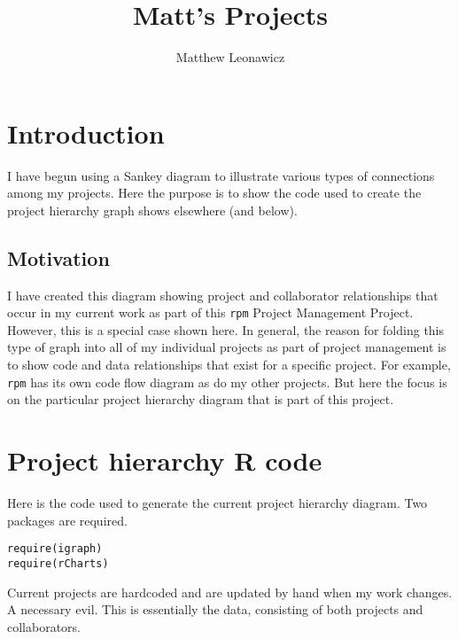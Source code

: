 \documentclass{article}\usepackage[]{graphicx}\usepackage[]{color}
\makeatletter
\newcommand{\hlstd}[1]{\textcolor[rgb]{0.514,0.58,0.588}{#1}}%
\newcommand{\hlkwd}[1]{\textcolor[rgb]{0.576,0.631,0.631}{#1}}%
\newenvironment{kframe}{%
 \def\at@end@of@kframe{}%
 \ifinner\ifhmode%
  \def\at@end@of@kframe{\end{minipage}}%
  \begin{minipage}{\columnwidth}%
 \fi\fi%
 \def\FrameCommand##1{\hskip\@totalleftmargin \hskip-\fboxsep
 \colorbox{shadecolor}{##1}\hskip-\fboxsep
     \hskip-\linewidth \hskip-\@totalleftmargin \hskip\columnwidth}%
 \MakeFramed {\advance\hsize-\width
   \@totalleftmargin\z@ \linewidth\hsize
   \@setminipage}}%
 {\par\unskip\endMakeFramed%
 \at@end@of@kframe}
\newenvironment{knitrout}{}{} %
\makeatother
\begin{document}
\title{Matt's Projects}
\author{Matthew Leonawicz}
\maketitle






\section{Introduction}
I have begun using a Sankey diagram to illustrate various types of connections among my projects.
Here the purpose is to show the code used to create the project hierarchy graph shows elsewhere (and below).

\subsection{Motivation}
I have created this diagram showing project and collaborator relationships that occur in my current work as part of this \texttt{rpm} Project Management Project.
However, this is a special case shown here.
In general, the reason for folding this type of graph into all of my individual projects as part of project management
is to show code and data relationships that exist for a specific project.
For example, \texttt{rpm} has its own code flow diagram as do my other projects.
But here the focus is on the particular project hierarchy diagram that is part of this project.

\section{Project hierarchy \textbf{R} code}
Here is the code used to generate the current project hierarchy diagram.
Two packages are required.

\begin{knitrout}
\color{fgcolor}\begin{kframe}
\begin{alltt}
\hlkwd{require}\hlstd{(igraph)}
\hlkwd{require}\hlstd{(rCharts)}
\end{alltt}
\end{kframe}
\end{knitrout}

Current projects are hardcoded and are updated by hand when my work changes. A necessary evil.
This is essentially the data, consisting of both projects and collaborators.
\end{document}
